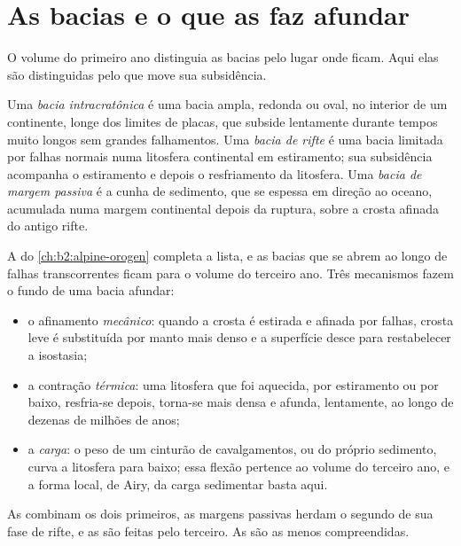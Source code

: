 \section{As bacias e o que as faz afundar}\label{sec:b2:basins-compared:types}

O volume do primeiro ano distinguia as bacias pelo lugar onde ficam. Aqui elas são distinguidas pelo que move
sua subsidência.

\begin{definition}\label{def:b2:basins-compared:types}
Uma \emph{bacia intracratônica} é uma bacia ampla, redonda ou oval, no
interior de um continente, longe dos limites de placas, que subside lentamente durante tempos muito longos
sem grandes falhamentos. Uma \emph{bacia de rifte} é uma bacia limitada por falhas normais
numa litosfera continental em estiramento; sua subsidência acompanha o estiramento e depois
o resfriamento da litosfera. Uma \emph{bacia de margem passiva} é a
cunha de sedimento, que se espessa em direção ao oceano, acumulada numa margem continental depois da
ruptura, sobre a crosta afinada do antigo rifte.
\end{definition}

A  do \cref{ch:b2:alpine-orogen} completa a lista, e as bacias que se abrem
ao longo de falhas transcorrentes ficam para o volume do terceiro ano. Três mecanismos fazem o fundo de uma
bacia afundar:
\begin{itemize}
  \item o afinamento \emph{mecânico}: quando a crosta é estirada e afinada por falhas, crosta leve
        é substituída por manto mais denso e a superfície desce para restabelecer a isostasia;
  \item a contração \emph{térmica}: uma litosfera que foi aquecida, por estiramento ou por
        baixo, resfria-se depois, torna-se mais densa e afunda, lentamente, ao longo de dezenas de milhões de anos;
  \item a \emph{carga}: o peso de um cinturão de cavalgamentos, ou do próprio sedimento, curva a
        litosfera para baixo; essa flexão pertence ao volume do terceiro ano, e a forma local, de Airy, da
        carga sedimentar basta aqui.
\end{itemize}
As  combinam os dois primeiros, as margens passivas herdam o segundo de sua fase de rifte, e as
 são feitas pelo terceiro. As  são as menos compreendidas.

